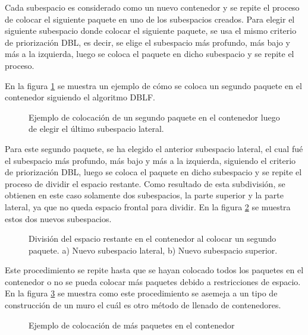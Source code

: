 Cada subespacio es considerado como un nuevo contenedor y se repite el proceso de colocar el siguiente paquete en uno de los subespacios creados. Para elegir el siguiente subespacio donde colocar el siguiente paquete, se usa el mismo criterio de priorización DBL, es decir, se elige el subespacio más profundo, más bajo y más a la izquierda, luego se coloca el paquete en dicho subespacio y se repite el proceso.

En la figura \ref{fig:segundo_paquete} se muestra un ejemplo de cómo se coloca un segundo paquete en el contenedor siguiendo el algoritmo DBLF.

\begin{figure}[H]
    \centering
    
    \caption{Ejemplo de colocación de un segundo paquete en el contenedor luego de elegir el último subespacio lateral.}
    \label{fig:segundo_paquete}
\end{figure}

Para este segundo paquete, se ha elegido el anterior subespacio lateral, el cual fué el subespacio más profundo, más bajo y más a la izquierda, siguiendo el criterio de priorización DBL, luego se coloca el paquete en dicho subespacio y se repite el proceso de dividir el espacio restante. Como resultado de esta subdivisión, se obtienen en este caso solamente dos subespacios, la parte superior y la parte lateral, ya que no queda espacio frontal para dividir. En la figura \ref{fig:segundos_subespacios} se muestra estos dos nuevos subespacios.

\begin{figure}[H]
    \centering
    
    \caption{División del espacio restante en el contenedor al colocar un segundo paquete. a) Nuevo subespacio lateral, b) Nuevo subespacio superior.}
    \label{fig:segundos_subespacios}
\end{figure}

Este procedimiento se repite hasta que se hayan colocado todos los paquetes en el contenedor o no se pueda colocar más paquetes debido a restricciones de espacio. En la figura \ref{fig:contruccion_muro} se muestra como este procedimiento se asemeja a un tipo de construcción de un muro el cuál es otro método de llenado de contenedores.

\begin{figure}[H]
    \centering
    
    \caption{Ejemplo de colocación de más paquetes en el contenedor}
    \label{fig:contruccion_muro}
\end{figure}

